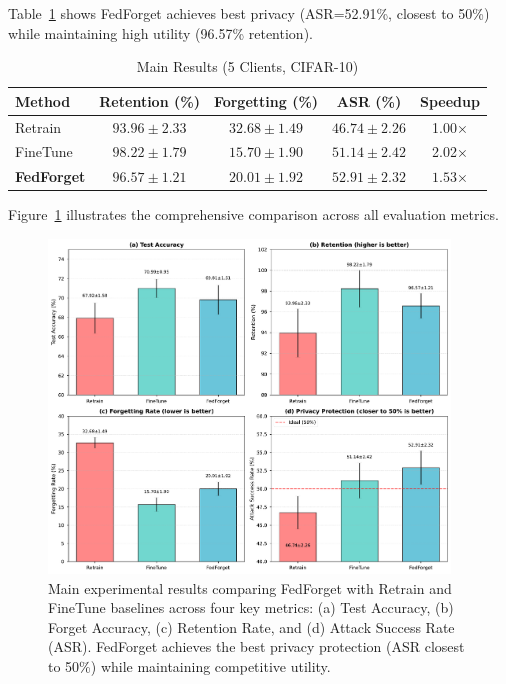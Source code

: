 \documentclass[11pt,a4paper]{article}
\begin{document}
Table~\ref{tab:main_results} shows FedForget achieves best privacy (ASR=52.91\%, closest to 50\%) while maintaining high utility (96.57\% retention).

\begin{table}[htbp]
\centering
\caption{Main Results (5 Clients, CIFAR-10)}
\label{tab:main_results}
\begin{tabular}{lcccc}
\toprule
Method & Retention (\%) & Forgetting (\%) & ASR (\%) & Speedup \\
\midrule
Retrain & $93.96 \pm 2.33$ & $\mathbf{32.68 \pm 1.49}$ & $46.74 \pm 2.26$ & 1.00× \\
FineTune & $\mathbf{98.22 \pm 1.79}$ & $15.70 \pm 1.90$ & $51.14 \pm 2.42$ & 2.02× \\
\textbf{FedForget} & $\mathbf{96.57 \pm 1.21}$ & $20.01 \pm 1.92$ & $\mathbf{52.91 \pm 2.32}$ & $\mathbf{1.53}$× \\
\bottomrule
\end{tabular}
\end{table}

Figure~\ref{fig:main_results} illustrates the comprehensive comparison across all evaluation metrics.

\begin{figure}[htbp]
\centering
\includegraphics[width=0.95\textwidth]{figures/figure1_main_results.pdf}
\caption{Main experimental results comparing FedForget with Retrain and FineTune baselines across four key metrics: (a) Test Accuracy, (b) Forget Accuracy, (c) Retention Rate, and (d) Attack Success Rate (ASR). FedForget achieves the best privacy protection (ASR closest to 50\%) while maintaining competitive utility.}
\label{fig:main_results}
\end{figure}
\end{document}
